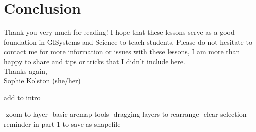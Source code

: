 \documentclass{article}
\begin{document}
\vspace{3cm}
\section{Conclusion}
Thank you very much for reading! I hope that these lessons serve as a good foundation in GISystems and Science to teach students. Please do not hesitate to contact me for more information or issues with these lessons, I am more than happy to share and tips or tricks that I didn't include here. \\

Thanks again, \\
Sophie Kolston (she/her)

add to intro

-zoom to layer
-basic arcmap tools
-dragging layers to rearrange
-clear selection
-reminder in part 1 to save as shapefile
\end{document}
